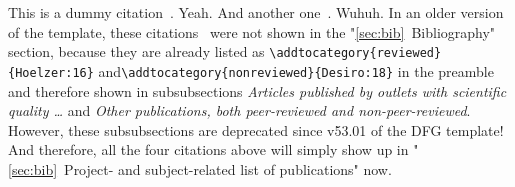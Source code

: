 \documentclass{scrartcl}
\begin{document}
This is a dummy citation~\cite{Hoelzer:17}. Yeah. And another one~\cite{Gerst:18}. Wuhuh. In an older version of the template, these citations~\cite{Hoelzer:16, Desiro:18} were not shown in the "\ref{sec:bib}~Bibliography" section, because they are already listed as \verb=\addtocategory{reviewed}{Hoelzer:16}= and\verb=\addtocategory{nonreviewed}{Desiro:18}= in the preamble and therefore shown in subsubsections \emph{Articles published by outlets with scientific quality \dots} and \emph{Other publications, both peer-reviewed and non-peer-reviewed}. However, these subsubsections are deprecated since v53.01 of the DFG template! And therefore, all the four citations above will simply show up in "\ref{sec:bib}~Project- and subject-related list of publications" now.

\lipsum[1]




\end{document}
